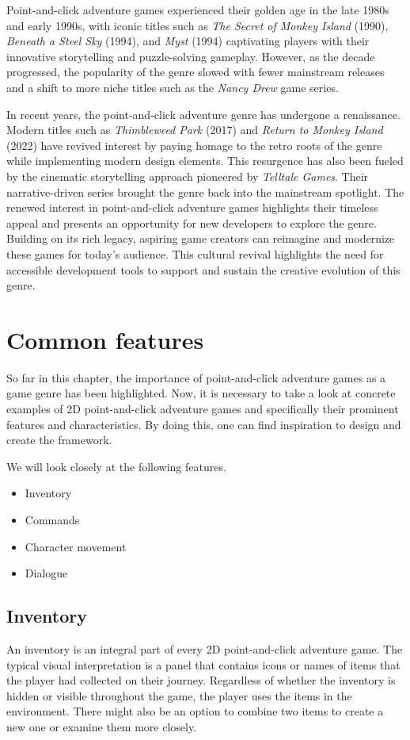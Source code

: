 Point-and-click adventure games experienced their golden age in the late 1980s and early 1990s, with iconic titles such as \textit{The Secret of Monkey Island} (1990), \textit{Beneath a Steel Sky} (1994), and \textit{Myst} (1994) captivating players with their innovative storytelling and puzzle-solving gameplay. However, as the decade progressed, the popularity of the genre slowed\cite{Qaffas202022} with fewer mainstream releases and a shift to more niche titles such as the \textit{Nancy Drew} game series.

In recent years, the point-and-click adventure genre has undergone a renaissance. Modern titles such as \textit{Thimbleweed Park} (2017) and \textit{Return to Monkey Island} (2022) have revived interest by paying homage to the retro roots of the genre while implementing modern design elements. This resurgence has also been fueled by the cinematic storytelling approach pioneered by \textit{Telltale Games}. Their narrative-driven series brought the genre back into the mainstream spotlight. The renewed interest in point-and-click adventure games highlights their timeless appeal and presents an opportunity for new developers to explore the genre. Building on its rich legacy, aspiring game creators can reimagine and modernize these games for today's audience. This cultural revival highlights the need for accessible development tools to support and sustain the creative evolution of this genre.

\section{Common features}
So far in this chapter, the importance of point-and-click adventure games as a game genre has been highlighted. Now, it is necessary to take a look at concrete examples of 2D point-and-click adventure games and specifically their prominent features and characteristics. By doing this, one can find inspiration to design and create the framework.

We will look closely at the following features.
\begin{itemize}
\item Inventory
\item Commands
\item Character movement
\item Dialogue
\end{itemize}

\subsection{Inventory}
An inventory is an integral part of every 2D point-and-click adventure game. The typical visual interpretation is a panel that contains icons or names of items that the player had collected on their journey. Regardless of whether the inventory is hidden or visible throughout the game, the player uses the items in the environment. There might also be an option to combine two items to create a new one or examine them more closely. 

